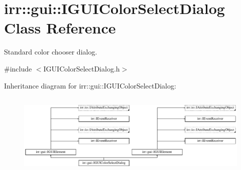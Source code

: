 \hypertarget{classirr_1_1gui_1_1IGUIColorSelectDialog}{}\section{irr\+:\+:gui\+:\+:I\+G\+U\+I\+Color\+Select\+Dialog Class Reference}
\label{classirr_1_1gui_1_1IGUIColorSelectDialog}


Standard color chooser dialog.  




{\ttfamily \#include $<$I\+G\+U\+I\+Color\+Select\+Dialog.\+h$>$}

Inheritance diagram for irr\+:\+:gui\+:\+:I\+G\+U\+I\+Color\+Select\+Dialog\+:\begin{figure}[H]
\begin{center}
\leavevmode
\includegraphics[height=4.038462cm]{classirr_1_1gui_1_1IGUIColorSelectDialog}
\end{center}
\end{figure}
